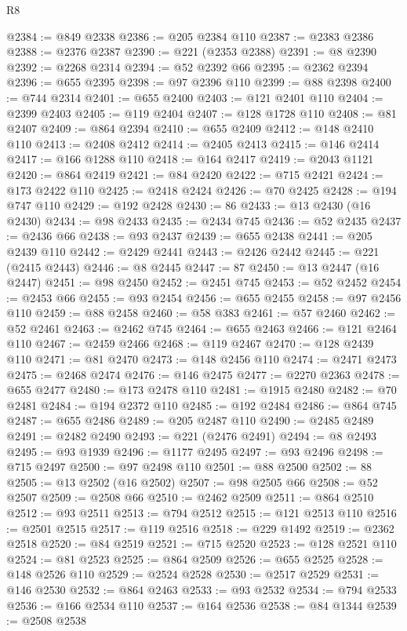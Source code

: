 \begin{lexlean}{R8}
\begin{coremodule}
@2384 := @849 @2338
@2386 := @205 @2384 @110
@2387 := @2383 @2386
@2388 := @2376 @2387
@2390 := @221 (@2353 @2388)
@2391 := @8 @2390
@2392 := @2268 @2314
@2394 := @52 @2392 @66
@2395 := @2362 @2394
@2396 := @655 @2395
@2398 := @97 @2396 @110
@2399 := @88 @2398
@2400 := @744 @2314
@2401 := @655 @2400
@2403 := @121 @2401 @110
@2404 := @2399 @2403
@2405 := @119 @2404
@2407 := @128 @1728 @110
@2408 := @81 @2407
@2409 := @864 @2394
@2410 := @655 @2409
@2412 := @148 @2410 @110
@2413 := @2408 @2412
@2414 := @2405 @2413
@2415 := @146 @2414
@2417 := @166 @1288 @110
@2418 := @164 @2417
@2419 := @2043 @1121
@2420 := @864 @2419
@2421 := @84 @2420
@2422 := @715 @2421
@2424 := @173 @2422 @110
@2425 := @2418 @2424
@2426 := @70 @2425
@2428 := @194 @747 @110
@2429 := @192 @2428
@2430 := 86
@2433 := @13 @2430 (@16 @2430)
@2434 := @98 @2433
@2435 := @2434 @745
@2436 := @52 @2435
@2437 := @2436 @66
@2438 := @93 @2437
@2439 := @655 @2438
@2441 := @205 @2439 @110
@2442 := @2429 @2441
@2443 := @2426 @2442
@2445 := @221 (@2415 @2443)
@2446 := @8 @2445
@2447 := 87
@2450 := @13 @2447 (@16 @2447)
@2451 := @98 @2450
@2452 := @2451 @745
@2453 := @52 @2452
@2454 := @2453 @66
@2455 := @93 @2454
@2456 := @655 @2455
@2458 := @97 @2456 @110
@2459 := @88 @2458
@2460 := @58 @383
@2461 := @57 @2460
@2462 := @52 @2461
@2463 := @2462 @745
@2464 := @655 @2463
@2466 := @121 @2464 @110
@2467 := @2459 @2466
@2468 := @119 @2467
@2470 := @128 @2439 @110
@2471 := @81 @2470
@2473 := @148 @2456 @110
@2474 := @2471 @2473
@2475 := @2468 @2474
@2476 := @146 @2475
@2477 := @2270 @2363
@2478 := @655 @2477
@2480 := @173 @2478 @110
@2481 := @1915 @2480
@2482 := @70 @2481
@2484 := @194 @2372 @110
@2485 := @192 @2484
@2486 := @864 @745
@2487 := @655 @2486
@2489 := @205 @2487 @110
@2490 := @2485 @2489
@2491 := @2482 @2490
@2493 := @221 (@2476 @2491)
@2494 := @8 @2493
@2495 := @93 @1939
@2496 := @1177 @2495
@2497 := @93 @2496
@2498 := @715 @2497
@2500 := @97 @2498 @110
@2501 := @88 @2500
@2502 := 88
@2505 := @13 @2502 (@16 @2502)
@2507 := @98 @2505 @66
@2508 := @52 @2507
@2509 := @2508 @66
@2510 := @2462 @2509
@2511 := @864 @2510
@2512 := @93 @2511
@2513 := @794 @2512
@2515 := @121 @2513 @110
@2516 := @2501 @2515
@2517 := @119 @2516
@2518 := @229 @1492
@2519 := @2362 @2518
@2520 := @84 @2519
@2521 := @715 @2520
@2523 := @128 @2521 @110
@2524 := @81 @2523
@2525 := @864 @2509
@2526 := @655 @2525
@2528 := @148 @2526 @110
@2529 := @2524 @2528
@2530 := @2517 @2529
@2531 := @146 @2530
@2532 := @864 @2463
@2533 := @93 @2532
@2534 := @794 @2533
@2536 := @166 @2534 @110
@2537 := @164 @2536
@2538 := @84 @1344
@2539 := @2508 @2538

\end{coremodule}
\end{lexlean}
